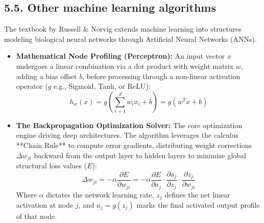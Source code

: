 \documentclass[../main.tex]{subfiles}
\begin{document}
\subsection{5.5. Other machine learning algorithms}
The textbook by Russell \& Norvig extends machine learning into structures modeling biological neural networks through Artificial Neural Networks (ANNs).
\begin{itemize}
    \item \textbf{Mathematical Node Profiling (Perceptron):} An input vector $x$ undergoes a linear combination via a dot product with weight matrix $w$, adding a bias offset $b$, before processing through a non-linear activation operator ($g$ e.g., Sigmoid, Tanh, or ReLU):
    \begin{equation}
        h_w(x) = g\left( \sum_{i=1}^{d} w_i x_i + b \right) = g(w^T x + b)
    \end{equation}
    \item \textbf{The Backpropagation Optimization Solver:} The core optimization engine driving deep architectures. The algorithm leverages the calculus **Chain Rule** to compute error gradients, distributing weight corrections $\Delta w_{ji}$ backward from the output layer to hidden layers to minimize global structural loss values ($E$):
    \begin{equation}
        \Delta w_{ji} = -\alpha \frac{\partial E}{\partial w_{ji}} = -\alpha \frac{\partial E}{\partial a_j} \cdot \frac{\partial a_j}{\partial z_j} \cdot \frac{\partial z_j}{\partial w_{ji}}
    \end{equation}
    Where $\alpha$ dictates the network learning rate, $z_j$ defines the net linear activation at node $j$, and $a_j = g(z_j)$ marks the final activated output profile of that node.
\end{itemize}
\end{document}
